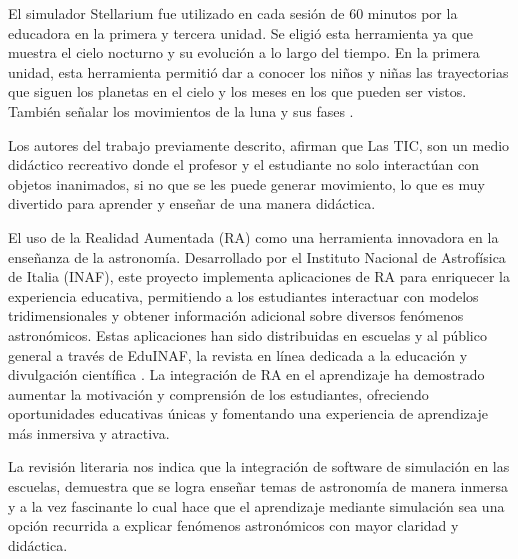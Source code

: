 El simulador Stellarium fue utilizado en cada sesión de 60 minutos por la educadora en la primera y tercera unidad. Se eligió esta herramienta ya que muestra el cielo nocturno y su evolución a lo largo del tiempo. En la primera unidad, esta herramienta permitió dar a conocer los niños y niñas las trayectorias que siguen los planetas en el cielo y los meses en los que pueden ser vistos. También señalar los movimientos de la luna y sus fases \cite{PerezLisboa2020}.

Los autores del trabajo previamente descrito, afirman que Las TIC, son un medio didáctico recreativo donde el profesor y el estudiante no solo interactúan con objetos inanimados, si no que se les puede generar movimiento, lo que es muy divertido para aprender y enseñar de una manera didáctica.

El uso de la Realidad Aumentada (RA) como una herramienta innovadora en la enseñanza de la astronomía. Desarrollado por el Instituto Nacional de Astrofísica de Italia (INAF), este proyecto implementa aplicaciones de RA para enriquecer la experiencia educativa, permitiendo a los estudiantes interactuar con modelos tridimensionales y obtener información adicional sobre diversos fenómenos astronómicos. Estas aplicaciones han sido distribuidas en escuelas y al público general a través de EduINAF, la revista en línea dedicada a la educación y divulgación científica \cite{nasa}. 
La integración de RA en el aprendizaje ha demostrado aumentar la motivación y comprensión de los estudiantes, ofreciendo oportunidades educativas únicas y fomentando una experiencia de aprendizaje más inmersiva y atractiva.

La revisión literaria nos indica que la integración de software de simulación en las escuelas, demuestra que se logra enseñar temas de astronomía de manera inmersa y a la vez fascinante lo cual hace
que el aprendizaje mediante simulación sea una opción recurrida a explicar fenómenos astronómicos con mayor claridad y didáctica.